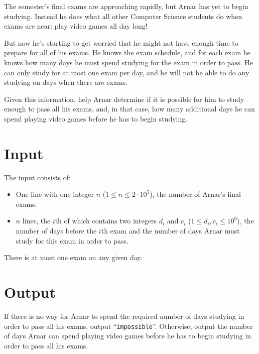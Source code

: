 
The semester's final exams are approaching rapidly, but Arnar has yet to
begin studying. Instead he does what all other Computer Science students do
when exams are near: play video games all day long!

But now he's starting to get worried that he might not have enough time to
prepare for all of his exams. He knows the exam schedule, and for each exam he
knows how many days he must spend studying for the exam in order to pass. He
can only study for at most one exam per day, and he will not be able to do any
studying on days when there are exams.

Given this information, help Arnar determine if it is possible for him to study
enough to pass all his exams, and, in that case, how many additional days he
can spend playing video games before he has to begin studying.

\section*{Input}
The input consists of:
\begin{itemize}
    \item One line with one integer $n$ ($1 \le n \le 2\cdot 10^5$), the number
    of Arnar's final exams.
    \item $n$ lines, the $i$th of which contains two integers $d_i$ and $c_i$ ($1
    \le d_i, c_i \le 10^9$), the number of days before the $i$th exam and the
    number of days Arnar must study for this exam in order to pass.
\end{itemize}

There is at most one exam on any given day.

\section*{Output}
If there is no way for Arnar to spend the required number of days studying in
order to pass all his exams, output ``\texttt{impossible}''. Otherwise, output the
number of days Arnar can spend playing video games before he has to begin
studying in order to pass all his exams.

